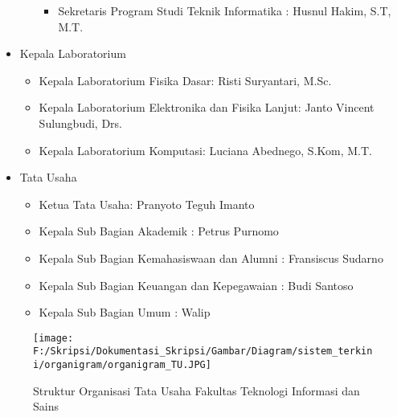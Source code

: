\begin{itemize}
\begin{itemize}
\begin{itemize}
			\item Sekretaris Program Studi Teknik Informatika : Husnul Hakim, S.T, M.T.
		\end{itemize}
	\end{itemize}
	\item Kepala Laboratorium
	\begin{itemize}
		\item Kepala Laboratorium Fisika Dasar: Risti Suryantari, M.Sc.
		\item Kepala Laboratorium Elektronika dan Fisika Lanjut: Janto Vincent Sulungbudi, Drs.
		\item Kepala Laboratorium Komputasi: Luciana Abednego, S.Kom, M.T.
	\end{itemize}
	\item Tata Usaha
	\begin{itemize}
		\item Ketua Tata Usaha: Pranyoto Teguh Imanto
		\item Kepala Sub Bagian Akademik : Petrus Purnomo
		\item Kepala Sub Bagian Kemahasiswaan dan Alumni : Fransiscus Sudarno
		\item Kepala Sub Bagian Keuangan dan Kepegawaian : Budi Santoso
		\item Kepala Sub Bagian Umum : Walip
	\end{itemize}
\end{itemize}


\begin{figure}[H]
	\centering
		\texttt{[image: F:/Skripsi/Dokumentasi\_Skripsi/Gambar/Diagram/sistem\_terkini/organigram/organigram\_TU.JPG]}
	\caption{Struktur Organisasi Tata Usaha Fakultas Teknologi Informasi dan Sains}
	\label{fig:organigram_TU}
\end{figure}